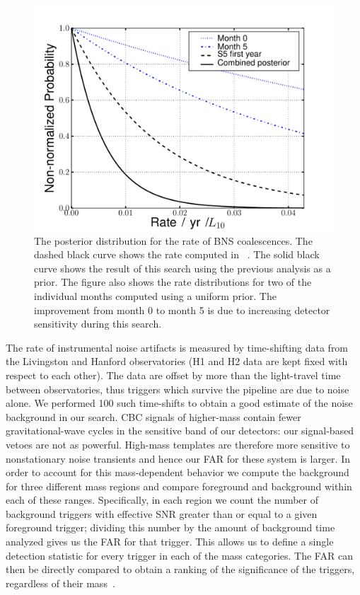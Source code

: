 \begin{figure}
\center
\includegraphics[width=6in]{figures/S5_lowmass_18_month_combined_bns_nonspin-posterior-comparison}
\caption{The posterior distribution for the rate of BNS coalescences. The
dashed black curve shows the rate computed in ~\cite{Collaboration:2009tt}.
The solid black curve shows the result of this search using the previous
analysis as a prior. The figure also shows the rate distributions for two of
the  individual months computed using a uniform prior. The improvement from
month 0 to month 5 is due to increasing detector sensitivity during this
search.  }  
   \label{fig:ul}
\end{figure}

The rate of instrumental noise artifacts is measured by time-shifting data from 
the Livingston and Hanford observatories (H1 and H2 data are kept fixed with 
respect to each other). The data are offset by more than the light-travel time 
between observatories, thus triggers which survive the pipeline are due to 
noise alone. We performed 100 such time-shifts to obtain a good estimate of 
the noise background in our search. \ac{CBC} signals of higher-mass contain 
fewer gravitational-wave cycles in the sensitive band of our detectors: 
our signal-based vetoes are not as powerful. High-mass templates are therefore 
more sensitive to nonstationary noise transients and hence our \ac{FAR} for 
these system is larger. In order to account for this mass-dependent behavior 
we compute the background for three different mass regions and compare 
foreground and background within each of these ranges. Specifically, in each
region we count the number of background triggers with effective
\ac{SNR} greater than or equal to a given foreground trigger; dividing
this number by the amount of background time analyzed gives us the
\ac{FAR} for that trigger. This allows us to define a single detection
statistic for every trigger in each of the mass categories.  The
\ac{FAR} can then be directly compared to obtain a ranking of the
significance of the triggers, regardless of their
mass~\cite{Collaboration:2009tt}. 

